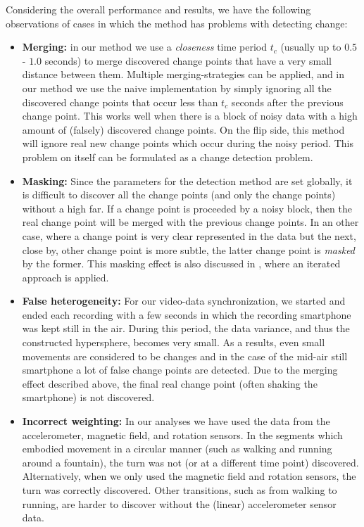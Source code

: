 Considering the overall performance and results, we have the following observations of cases in which the method has problems with detecting change:
\begin{itemize}
  \item \textbf{Merging:} in our method we use a \emph{closeness} time period $t_c$ (usually up to $0.5$ - $1.0$ seconds) to merge discovered change points that have a very small distance between them.
  Multiple merging-strategies can be applied, and in our method we use the naive implementation by simply ignoring all the discovered change points that occur less than $t_c$ seconds after the previous change point.
  This works well when there is a block of noisy data with a high amount of (falsely) discovered change points.
  On the flip side, this method will ignore real new change points which occur during the noisy period.
  This problem on itself can be formulated as a change detection problem.
  \item \textbf{Masking:} Since the parameters for the detection method are set globally, it is difficult to discover all the change points (and only the change points) without a high \gls{far}.
  If a change point is proceeded by a noisy block, then the real change point will be merged with the previous change points.
  In an other case, where a change point is very clear represented in the data but the next, close by, other change point is more subtle, the latter change point is \emph{masked} by the former.
  This masking effect is also discussed in \cite{inclan1994use}, where an iterated approach is applied.
  \item \textbf{False heterogeneity:} For our video-data synchronization, we started and ended each recording with a few seconds in which the recording smartphone was kept still in the air.
  During this period, the data variance, and thus the constructed hypersphere, becomes very small.
  As a results, even small movements are considered to be changes and in the case of the mid-air still smartphone a lot of false change points are detected.
  Due to the merging effect described above, the final real change point (often shaking the smartphone) is not discovered.
  \item \textbf{Incorrect weighting:} In our analyses we have used the data from the accelerometer, magnetic field, and rotation sensors.
  In the segments which embodied movement in a circular manner (such as walking and running around a fountain), the turn was not (or at a different time point) discovered.
  Alternatively, when we only used the magnetic field and rotation sensors, the turn was correctly discovered.
  Other transitions, such as from walking to running, are harder to discover without the (linear) accelerometer sensor data.
\end{itemize}

